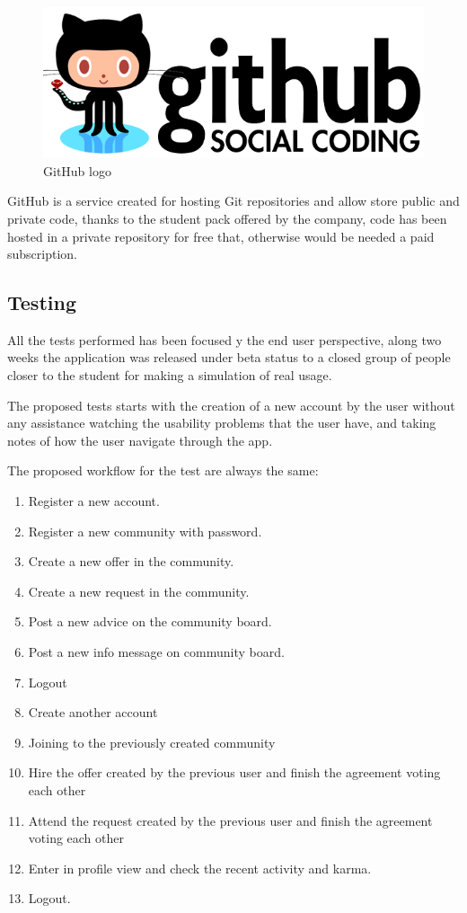\documentclass{DeustoFDP}
\begin{document}
\begin{figure}[h]
\centering
\includegraphics[width=0.7\linewidth]{fig/github-logo}
\caption[GitHub logo]{GitHub logo}
\label{fig:github-logo}
\end{figure}

GitHub \cite{Github} is a service created for hosting Git repositories and allow store public and private code, thanks to the student pack offered by the company, code has been hosted in a private repository for free that, otherwise would be needed a paid subscription.
\subsection{Testing}
All the tests performed has been focused y the end user perspective, along two weeks the application was released under beta status to a closed group of people closer to the student for making a simulation of real usage.

The proposed tests starts with the creation of a new account by the user without any assistance watching the usability problems that the user have, and taking notes of how the user navigate through the app.

The proposed workflow for the test are always the same:

\begin{enumerate}
	\item Register a new account.
	\item Register a new community with password.
	\item Create a new offer in the community.
	\item Create a new request in the community.
	\item Post a new advice on the community board.
	\item Post a new info message on community board.
	\item Logout
	\item Create another account
	\item Joining to the previously created community
	\item Hire the offer created by the previous user and finish the agreement voting each other
	\item Attend the request created by the previous user and finish the agreement voting each other
	\item Enter in profile view and check the recent activity and karma.
	\item Logout.
\end{enumerate}
\end{document}
